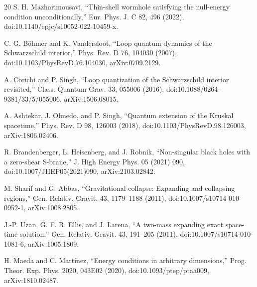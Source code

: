 \documentclass[pdflatex,sn-mathphys-num]{sn-jnl}
\begin{document}
\begin{thebibliography}{20}
 S. H. Mazharimousavi, “Thin-shell wormhole satisfying the null-energy condition unconditionally,” Eur. Phys. J. C 82, 496 (2022), doi:10.1140/epjc/s10052-022-10459-x.

 C. G. Böhmer and K. Vandersloot, “Loop quantum dynamics of the Schwarzschild interior,” Phys. Rev. D 76, 104030 (2007), doi:10.1103/PhysRevD.76.104030, arXiv:0709.2129.

 A. Corichi and P. Singh, “Loop quantization of the Schwarzschild interior revisited,” Class. Quantum Grav. 33, 055006 (2016), doi:10.1088/0264-9381/33/5/055006, arXiv:1506.08015.

 A. Ashtekar, J. Olmedo, and P. Singh, “Quantum extension of the Kruskal spacetime,” Phys. Rev. D 98, 126003 (2018), doi:10.1103/PhysRevD.98.126003, arXiv:1806.02406.

 R. Brandenberger, L. Heisenberg, and J. Robnik, “Non-singular black holes with a zero-shear S-brane,” J. High Energy Phys. 05 (2021) 090, doi:10.1007/JHEP05(2021)090, arXiv:2103.02842.

 M. Sharif and G. Abbas, “Gravitational collapse: Expanding and collapsing regions,” Gen. Relativ. Gravit. 43, 1179--1188 (2011), doi:10.1007/s10714-010-0952-1, arXiv:1008.2805.

 J.-P. Uzan, G. F. R. Ellis, and J. Larena, “A two-mass expanding exact space-time solution,” Gen. Relativ. Gravit. 43, 191--205 (2011), doi:10.1007/s10714-010-1081-6, arXiv:1005.1809.

 H. Maeda and C. Martínez, “Energy conditions in arbitrary dimensions,” Prog. Theor. Exp. Phys. 2020, 043E02 (2020), doi:10.1093/ptep/ptaa009, arXiv:1810.02487.

\end{thebibliography}
\end{document}
